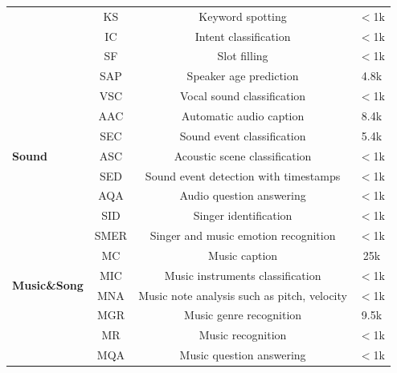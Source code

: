 \documentclass{article}
\begin{document}
\begin{table}[t!]
{\begin{tabular}{@{}lccc@{}}
 & KS                      & Keyword spotting                                                                                                & $<$1k            \\
 & IC                      & Intent classification                                     & $<$1k            \\
 & SF                      & Slot filling                                            & $<$1k            \\
 & SAP                             & Speaker age prediction                                                         & 4.8k          \\
  & VSC              & Vocal sound classification                                                                  & $<$1k            \\\midrule

\multirow{5}{*}{\textbf{Sound}} & AAC                               & Automatic audio caption                           & 8.4k          \\
 & SEC                    & Sound event classification                   & 5.4k          \\
 & ASC                      & Acoustic scene classification    &  $<$1k          \\
 & SED                             & Sound event detection with timestamps                                        & $<$1k           \\
 & AQA                                    & Audio question answering                                                & $<$1k           \\\midrule


\multirow{9}{*}{\textbf{Music\&Song}} & SID     & Singer identification                                                                        & $<$1k           \\
 & SMER                        & Singer and music emotion recognition                                                                       & $<$1k \\
 & MC                & Music caption                     & 25k           \\
 & MIC                   & Music instruments classification                                              & $<$1k            \\
 & MNA                               & Music note analysis such as pitch, velocity &  $<$1k \\
 & MGR                            & Music genre recognition                                                       & 9.5k          \\
 & MR                          & Music recognition                                       & $<$1k           \\
 & MQA                                     & Music question answering                          & $<$1k               \\ \bottomrule

\end{tabular}%
}
\label{tab:train_table}
\end{table}
\end{document}
